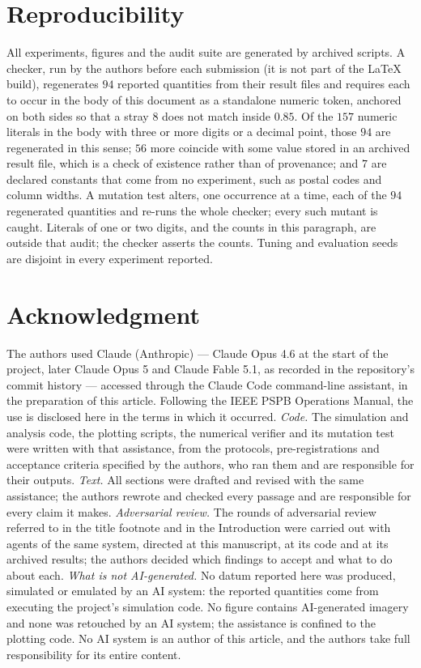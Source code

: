 \documentclass[journal]{IEEEtran}
\theoremstyle{definition}
\begin{document}
\section*{Reproducibility}
All experiments, figures and the audit suite are generated by archived
scripts. A checker, run by the authors before each submission (it is not part
of the \LaTeX{} build), regenerates $94$ reported quantities from their
result files and requires each to occur in the body of this document as a
standalone numeric token, anchored on both sides so that a stray $8$ does not
match inside $0.85$. Of the $157$ numeric literals in the body with three or
more digits or a decimal point, those $94$ are regenerated in this sense;
$56$ more coincide with some value stored in an archived result file, which is
a check of existence rather than of provenance; and $7$ are declared constants
that come from no experiment, such as postal codes and column widths. A
mutation test alters, one occurrence at a time, each of the $94$ regenerated
quantities and re-runs the whole checker; every such mutant is caught.
Literals of one or two digits, and the counts in this paragraph, are outside
that audit; the checker asserts the counts. Tuning and evaluation seeds are
disjoint in every experiment reported.

\section*{Acknowledgment}
The authors used Claude (Anthropic) --- Claude Opus 4.6 at the start of
the project, later Claude Opus 5 and Claude Fable 5.1, as recorded in the
repository's commit history --- accessed through the Claude Code
command-line assistant, in the preparation of this article. Following the IEEE PSPB Operations Manual, the use is
disclosed here in the terms in which it occurred. \emph{Code.} The simulation and analysis code, the plotting scripts, the
numerical verifier and its mutation test were written with that
assistance, from the protocols, pre-registrations and acceptance criteria
specified by the authors, who ran them and are responsible for their
outputs. \emph{Text.} All sections were drafted and revised with the same
assistance; the authors rewrote and checked every passage and are
responsible for every claim it makes. \emph{Adversarial review.} The rounds of adversarial review referred to in the title
footnote and in the Introduction were carried out with
agents of the same system, directed at this manuscript, at its code and at
its archived results; the authors decided which findings to accept and
what to do about each. \emph{What is not AI-generated.} No datum reported here was produced,
simulated or emulated by an AI system: the reported quantities come from
executing the project's simulation code. No figure contains AI-generated
imagery and none was retouched by an AI system; the assistance is confined
to the plotting code. No AI system is an author of this article, and the
authors take full responsibility for its entire content.



\end{document}
